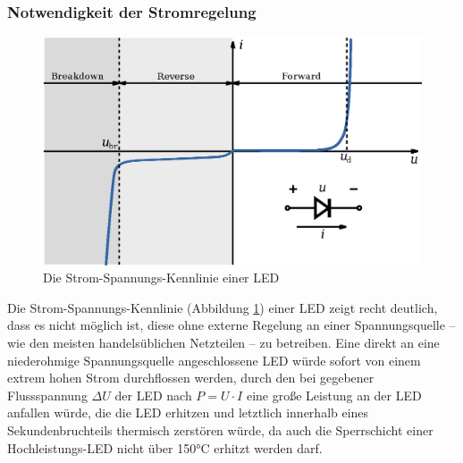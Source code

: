 \documentclass[12pt,a4paper,notitlepage]{article}
\begin{document}
\subsubsection{Notwendigkeit der Stromregelung}
\begin{figure}
\begin{center}
\includegraphics{images/diode-iv-curve_bw.eps}
\caption{Die Strom-Spannungs-Kennlinie einer LED}
\label{diode-iv-curve}
\end{center}
\end{figure}
Die Strom-Spannungs-Kennlinie (Abbildung \ref{diode-iv-curve}) einer \gls{LED} zeigt recht deutlich, dass es nicht möglich ist, diese ohne externe Regelung an einer Spannungsquelle -- wie den meisten handelsüblichen Netzteilen -- zu betreiben. Eine direkt an eine niederohmige Spannungsquelle angeschlossene \gls{LED} würde sofort von einem extrem hohen Strom durchflossen werden, durch den bei gegebener \gls{Flussspannung} $\Delta U$ der \gls{LED} nach $P=U\cdot I$ eine große Leistung an der \gls{LED} anfallen würde, die die \gls{LED} erhitzen und letztlich innerhalb eines Sekundenbruchteils thermisch zerstören würde, da auch die \gls{Sperrschicht} einer Hochleistungs-\gls{LED} nicht über 150°C erhitzt werden darf\cite{PHILIPS1,PHILIPS2}.
\end{document}
